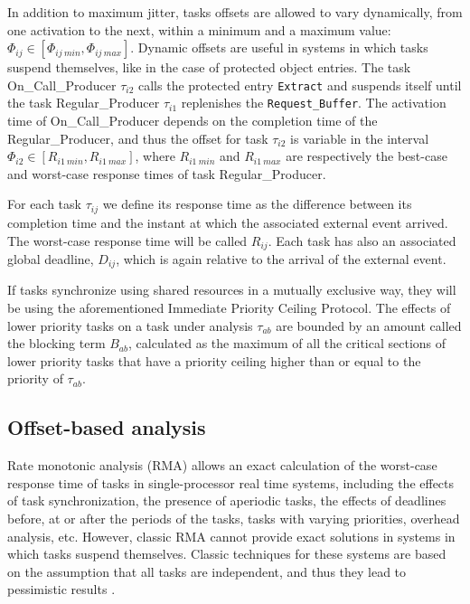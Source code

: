 \documentclass{article}
\begin{document}
In addition to maximum jitter, tasks offsets are allowed to vary dynamically, from one activation to the next, within a minimum and a maximum value: $\Phi_{ij} \in [\Phi_{ij\ min}, \Phi_{ij\ max}]$. Dynamic offsets are useful in systems in which tasks suspend themselves, like in the case of protected object entries. The task On\_Call\_Producer $\tau_{i2}$ calls the protected entry \texttt{Extract} and suspends itself until the task Regular\_Producer $\tau_{i1}$ replenishes the \texttt{Request\_Buffer}. The activation time of On\_Call\_Producer depends on the completion time of the Regular\_Producer, and thus the offset for task $\tau_{i2}$ is variable in the interval $\Phi_{i2} \in [R_{i1\ min}, R_{i1\ max}]$, where $R_{i1\ min}$ and $R_{i1\ max}$ are respectively the best-case and worst-case response times of task Regular\_Producer.

For each task $\tau_{ij}$ we define its response time as the difference between its completion time and the instant at which the associated external event arrived. The worst-case response time will be called $R_{ij}$. Each task has also an associated global deadline, $D_{ij}$, which is again relative to the arrival of the external event.

If tasks synchronize using shared resources in a mutually exclusive way, they will be using the aforementioned Immediate Priority Ceiling Protocol. The effects of lower priority tasks on a task under analysis $\tau_{ab}$ are bounded by an amount called the blocking term $B_{ab}$, calculated as the maximum of all the critical sections of lower priority tasks that have a priority ceiling higher than or equal to the priority of $\tau_{ab}$.

\subsection{Offset-based analysis}

Rate monotonic analysis (RMA) \cite{rm-dm} allows an exact calculation of the worst-case response time of tasks in single-processor real time systems, including the effects of task synchronization, the presence of aperiodic tasks, the effects of deadlines before, at or after the periods of the tasks, tasks with varying priorities, overhead analysis, etc. However, classic RMA \cite{practitioner-common-data} cannot provide exact solutions in systems in which tasks suspend themselves. Classic techniques for these systems are based on the assumption that all tasks are independent, and thus they lead to pessimistic results \cite{pessimistic-rma}.
\end{document}

